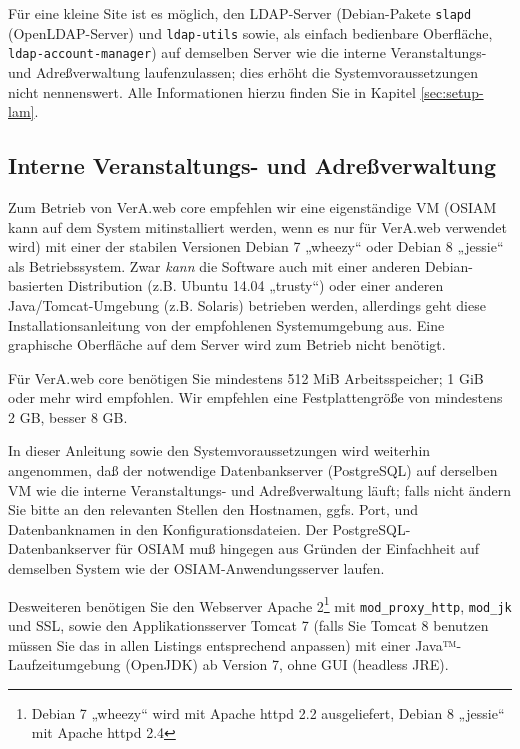 Für eine kleine Site ist es möglich, den LDAP-Server (Debian-Pakete
\texttt{slapd} (OpenLDAP-Server) und \texttt{ldap-utils} sowie, als
einfach bedienbare Oberfläche, \texttt{ldap-account-manager}) auf
demselben Server wie die interne Veranstaltungs- und Adreßverwaltung
laufenzulassen; dies erhöht die Systemvoraussetzungen nicht nennenswert.
\ifupgradeanleitung\else%
Alle Informationen hierzu finden Sie in Kapitel \ref{sec:setup-lam}.
\fi

\subsection{Interne Veranstaltungs- und Adreßverwaltung}\label{subsec:req-core}

Zum Betrieb von VerA.web core empfehlen wir eine eigenständige VM
\ifoa
(OSIAM kann auf dem System mitinstalliert werden, wenn es nur für
VerA.web verwendet wird)
\fi%
mit einer der stabilen Versionen Debian 7 „wheezy“ oder Debian 8
„jessie“ als Betriebssystem. Zwar \emph{kann} die Software auch
mit einer anderen Debian-basierten Distribution (z.B. Ubuntu 14.04
„trusty“) oder einer anderen Java/Tomcat-Umgebung (z.B. Solaris)
betrieben werden, allerdings geht diese Installationsanleitung von
der empfohlenen Systemumgebung aus. Eine graphische Oberfläche auf
dem Server wird zum Betrieb nicht benötigt.

Für VerA.web core benötigen Sie mindestens 512 MiB Arbeitsspeicher;
1 GiB oder mehr wird empfohlen. Wir empfehlen eine Festplattengröße
von mindestens 2 GB, besser 8 GB.

In dieser Anleitung sowie den Systemvoraussetzungen wird weiterhin
angenommen, daß der notwendige Datenbankserver (PostgreSQL) auf
derselben VM wie die interne Veranstaltungs- und Adreßverwaltung läuft;
falls nicht ändern Sie bitte an den relevanten Stellen den Hostnamen,
ggfs. Port, und Datenbanknamen in den Konfigurationsdateien.
\ifoa
Der PostgreSQL-Datenbankserver für OSIAM muß hingegen aus Gründen der
Einfachheit auf demselben System wie der OSIAM-Anwendungsserver laufen.
\fi%

Desweiteren benötigen Sie den Webserver Apache 2\Hair\footnote
{\label{fn:apache}Debian 7 „wheezy“ wird mit Apache httpd 2.2
ausgeliefert, Debian 8 „jessie“ mit Apache httpd 2.4} mit
\ifoa
\texttt{mod\_proxy\_http},
\fi%
\texttt{mod\_jk} und SSL, sowie den Applikationsserver Tomcat 7
(falls Sie Tomcat 8 benutzen müssen Sie das in allen Listings
entsprechend anpassen) mit einer Java™-Laufzeitumgebung (OpenJDK)
ab Version 7, ohne GUI (headless JRE).

